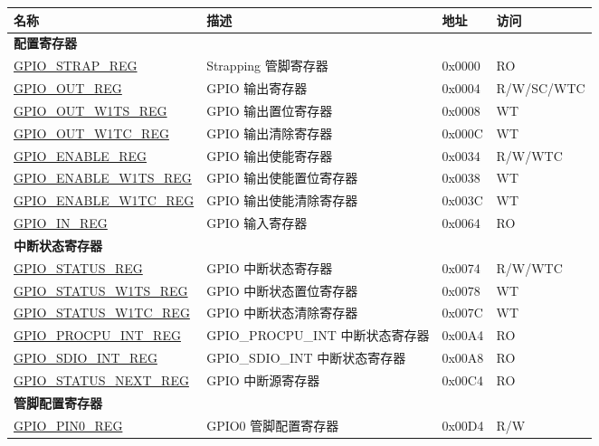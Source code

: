 \begin{longtable}{ | p{6cm} | p{7.2cm} | p{1.3cm} | p{1cm} | }
\hline\rowcolor{lightgray}
\textbf{名称} & \textbf{描述} &  \textbf{地址} & \textbf{访问} \\ \hline
\endhead
\multicolumn{4}{|l|}{\textbf{配置寄存器}} \\ \hline
\hyperref[regdesc:GPIOSTRAPREG]{GPIO\_STRAP\_REG} & Strapping 管脚寄存器 & 0x0000 & RO \\ \hline
\hyperref[regdesc:GPIOOUTREG]{GPIO\_OUT\_REG} & GPIO 输出寄存器 & 0x0004 & R/W/SC/WTC \\ \hline
\hyperref[regdesc:GPIOOUTW1TSREG]{GPIO\_OUT\_W1TS\_REG} & GPIO 输出置位寄存器 & 0x0008 & WT \\ \hline
\hyperref[regdesc:GPIOOUTW1TCREG]{GPIO\_OUT\_W1TC\_REG} & GPIO 输出清除寄存器 & 0x000C & WT \\ \hline
\hyperref[regdesc:GPIOENABLEREG]{GPIO\_ENABLE\_REG} & GPIO 输出使能寄存器 & 0x0034 & R/W/WTC \\ \hline
\hyperref[regdesc:GPIOENABLEW1TSREG]{GPIO\_ENABLE\_W1TS\_REG} & GPIO 输出使能置位寄存器 & 0x0038 & WT \\ \hline
\hyperref[regdesc:GPIOENABLEW1TCREG]{GPIO\_ENABLE\_W1TC\_REG} & GPIO 输出使能清除寄存器 & 0x003C & WT \\ \hline
\hyperref[regdesc:GPIOINREG]{GPIO\_IN\_REG} & GPIO 输入寄存器 & 0x0064 & RO \\ \hline
\multicolumn{4}{|l|}{\textbf{中断状态寄存器}} \\ \hline
\hyperref[regdesc:GPIOSTATUSREG]{GPIO\_STATUS\_REG} & GPIO 中断状态寄存器 & 0x0074 & R/W/WTC \\ \hline
\hyperref[regdesc:GPIOSTATUSW1TSREG]{GPIO\_STATUS\_W1TS\_REG} & GPIO 中断状态置位寄存器 & 0x0078 & WT \\ \hline
\hyperref[regdesc:GPIOSTATUSW1TCREG]{GPIO\_STATUS\_W1TC\_REG} & GPIO 中断状态清除寄存器 & 0x007C & WT \\ \hline
\hyperref[regdesc:GPIOPROCPUINTREG]{GPIO\_PROCPU\_INT\_REG} & GPIO\_PROCPU\_INT 中断状态寄存器 & 0x00A4 & RO \\ \hline
\hyperref[regdesc:GPIOSDIOINTREG]{GPIO\_SDIO\_INT\_REG} & GPIO\_SDIO\_INT 中断状态寄存器 & 0x00A8 & RO \\ \hline
\hyperref[regdesc:GPIOSTATUSNEXTREG]{GPIO\_STATUS\_NEXT\_REG} & GPIO 中断源寄存器 & 0x00C4 & RO \\ \hline
\multicolumn{4}{|l|}{\textbf{管脚配置寄存器}} \\ \hline
\hyperref[regdesc:GPIOPINNREG]{GPIO\_PIN0\_REG} & GPIO0 管脚配置寄存器 & 0x00D4 & R/W \\ \hline

\end{longtable}
